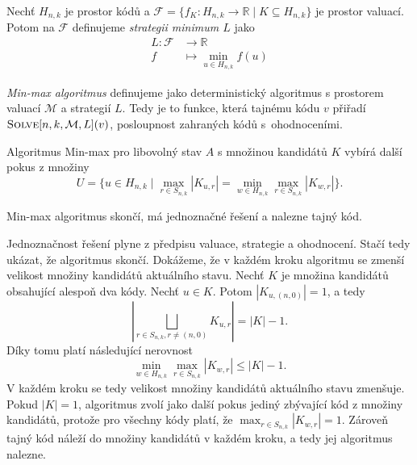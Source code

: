 \begin{definice}
    Nechť $H_{n,k}$ je prostor kódů a $\mathcal{F} = \{f_K\colon H_{n,k} \to \mathbb{R} \mid K \subseteq H_{n,k}\}$ je prostor valuací. Potom na $\mathcal{F}$ definujeme \emph{strategii minimum $L$} jako
    \begin{align*}
        L \colon \mathcal{F} &\to \mathbb{R} \\
        f &\mapsto \min_{u\in H_{n,k}} f(u)
    \end{align*}
\end{definice}

\begin{definice}
    \emph{Min-max algoritmus} definujeme jako deterministický algoritmus s prostorem valuací $\mathcal{M}$ a strategií $L$. Tedy je to funkce, která tajnému kódu $v$ přiřadí $\textsc{Solve}[n, k, \mathcal{M}, L](v)$, posloupnost zahraných kódů s~ohodnoceními.
\end{definice}



Algoritmus Min-max pro libovolný stav $A$ s množinou kandidátů $K$ vybírá další pokus z množiny
\[U = \{u \in H_{n,k} \mid \max_{r\in S_{n,k}} |K_{u,r}| = \min_{w \in H_{n,k}} \max_{r\in S_{n,k}} |K_{w,r}| \}.\]

\begin{tvrz}
    Min-max algoritmus skončí, má jednoznačné řešení a nalezne tajný kód. 
\end{tvrz}
\begin{dukaz}
    Jednoznačnost řešení plyne z předpisu valuace, strategie a ohodnocení. Stačí tedy ukázat, že algoritmus skončí. Dokážeme, že v každém kroku algoritmu se zmenší velikost množiny kandidátů aktuálního stavu. Nechť $K$ je množina kandidátů obsahující alespoň dva kódy. Nechť $u \in K$. Potom $|K_{u,(n,0)}| = 1$, a tedy 
    \[|\bigsqcup_{r\in S_{n,k}, r \neq (n,0)} K_{u,r} | = |K| - 1.\]
    Díky tomu platí následující nerovnost
    \[\min_{w \in H_{n,k}} \max_{r\in S_{n,k}} |K_{w,r}| \leq |K|-1.\]
    V každém kroku se tedy velikost množiny kandidátů aktuálního stavu zmenšuje. Pokud $|K| = 1$, algoritmus zvolí jako další pokus jediný zbývající kód z množiny kandidátů, protože pro všechny kódy platí, že
    $\max_{r\in S_{n,k}} |K_{w,r}| = 1$.
    Zároveň tajný kód náleží do množiny kandidátů v každém kroku, a tedy jej algoritmus nalezne. 
\end{dukaz}

